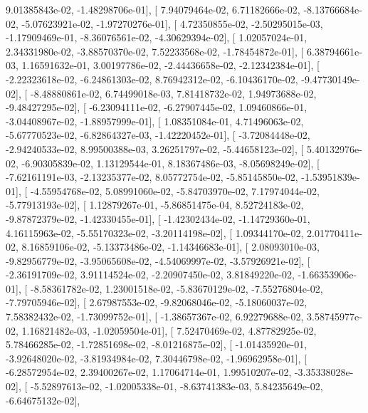 \documentclass{article}
\begin{document}
          9.01385843e-02,  -1.48298706e-01],
       [  7.94079464e-02,   6.71182666e-02,  -8.13766684e-02,
         -5.07623921e-02,  -1.97270276e-01],
       [  4.72350855e-02,  -2.50295015e-03,  -1.17909469e-01,
         -8.36076561e-02,  -4.30629394e-02],
       [  1.02057024e-01,   2.34331980e-02,  -3.88570370e-02,
          7.52233568e-02,  -1.78454872e-01],
       [  6.38794661e-03,   1.16591632e-01,   3.00197786e-02,
         -2.44436658e-02,  -2.12342384e-01],
       [ -2.22323618e-02,  -6.24861303e-02,   8.76942312e-02,
         -6.10436170e-02,  -9.47730149e-02],
       [ -8.48880861e-02,   6.74499018e-03,   7.81418732e-02,
          1.94973688e-02,  -9.48427295e-02],
       [ -6.23094111e-02,  -6.27907445e-02,   1.09460866e-01,
         -3.04408967e-02,  -1.88957999e-01],
       [  1.08351084e-01,   4.71496063e-02,  -5.67770523e-02,
         -6.82864327e-03,  -1.42220452e-01],
       [ -3.72084448e-02,  -2.94240533e-02,   8.99500388e-03,
          3.26251797e-02,  -5.44658123e-02],
       [  5.40132976e-02,  -6.90305839e-02,   1.13129544e-01,
          8.18367486e-03,  -8.05698249e-02],
       [ -7.62161191e-03,  -2.13235377e-02,   8.05772754e-02,
         -5.85145850e-02,  -1.53951839e-01],
       [ -4.55954768e-02,   5.08991060e-02,  -5.84703970e-02,
          7.17974044e-02,  -5.77913193e-02],
       [  1.12879267e-01,  -5.86851475e-04,   8.52724183e-02,
         -9.87872379e-02,  -1.42330455e-01],
       [ -1.42302434e-02,  -1.14729360e-01,   4.16115963e-02,
         -5.55170323e-02,  -3.20114198e-02],
       [  1.09344170e-02,   2.01770411e-02,   8.16859106e-02,
         -5.13373486e-02,  -1.14346683e-01],
       [  2.08093010e-03,  -9.82956779e-02,  -3.95065608e-02,
         -4.54069997e-02,  -3.57926921e-02],
       [ -2.36191709e-02,   3.91114524e-02,  -2.20907450e-02,
          3.81849220e-02,  -1.66353906e-01],
       [ -8.58361782e-02,   1.23001518e-02,  -5.83670129e-02,
         -7.55276804e-02,  -7.79705946e-02],
       [  2.67987553e-02,  -9.82068046e-02,  -5.18060037e-02,
          7.58382432e-02,  -1.73099752e-01],
       [ -1.38657367e-02,   6.92279688e-02,   3.58745977e-02,
          1.16821482e-03,  -1.02059504e-01],
       [  7.52470469e-02,   4.87782925e-02,   5.78466285e-02,
         -1.72851698e-02,  -8.01216875e-02],
       [ -1.01435920e-01,  -3.92648020e-02,  -3.81934984e-02,
          7.30446798e-02,  -1.96962958e-01],
       [ -6.28572954e-02,   2.39400267e-02,   1.17064714e-01,
          1.99510207e-02,  -3.35338028e-02],
       [ -5.52897613e-02,  -1.02005338e-01,  -8.63741383e-03,
          5.84235649e-02,  -6.64675132e-02],
\end{document}
